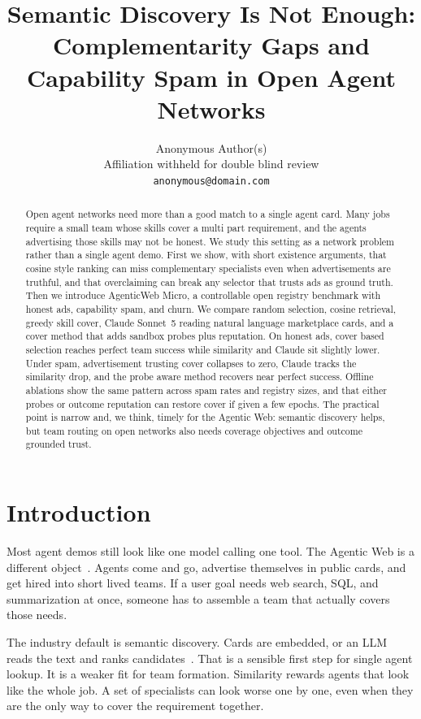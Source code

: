 \documentclass{article}
\title{Semantic Discovery Is Not Enough:\\
Complementarity Gaps and Capability Spam in Open Agent Networks}
\author{
  Anonymous Author(s)\\
  Affiliation withheld for double blind review\\
  \texttt{anonymous@domain.com}
}
\begin{document}
\maketitle

\begin{abstract}
Open agent networks need more than a good match to a single agent card.
Many jobs require a small team whose skills cover a multi part requirement, and the agents advertising those skills may not be honest.
We study this setting as a network problem rather than a single agent demo.
First we show, with short existence arguments, that cosine style ranking can miss complementary specialists even when advertisements are truthful, and that overclaiming can break any selector that trusts ads as ground truth.
Then we introduce AgenticWeb Micro, a controllable open registry benchmark with honest ads, capability spam, and churn.
We compare random selection, cosine retrieval, greedy skill cover, Claude Sonnet~5 reading natural language marketplace cards, and a cover method that adds sandbox probes plus reputation.
On honest ads, cover based selection reaches perfect team success while similarity and Claude sit slightly lower.
Under spam, advertisement trusting cover collapses to zero, Claude tracks the similarity drop, and the probe aware method recovers near perfect success.
Offline ablations show the same pattern across spam rates and registry sizes, and that either probes or outcome reputation can restore cover if given a few epochs.
The practical point is narrow and, we think, timely for the Agentic Web: semantic discovery helps, but team routing on open networks also needs coverage objectives and outcome grounded trust.
\end{abstract}

\section{Introduction}

Most agent demos still look like one model calling one tool.
The Agentic Web is a different object~\citep{projectnanda2026,raskar2025}.
Agents come and go, advertise themselves in public cards, and get hired into short lived teams.
If a user goal needs web search, SQL, and summarization at once, someone has to assemble a team that actually covers those needs.

The industry default is semantic discovery.
Cards are embedded, or an LLM reads the text and ranks candidates~\citep{karpukhin2020,lewis2020}.
That is a sensible first step for single agent lookup.
It is a weaker fit for team formation.
Similarity rewards agents that look like the whole job.
A set of specialists can look worse one by one, even when they are the only way to cover the requirement together.
\end{document}
